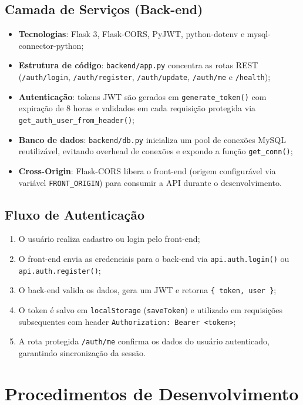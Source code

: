 \subsection{Camada de Serviços (Back-end)}
\begin{itemize}
    \item \textbf{Tecnologias}: Flask 3, Flask-CORS, PyJWT, python-dotenv e mysql-connector-python;
    \item \textbf{Estrutura de código}: \texttt{backend/app.py} concentra as rotas REST (\texttt{/auth/login}, \texttt{/auth/register}, \texttt{/auth/update}, \texttt{/auth/me} e \texttt{/health});
    \item \textbf{Autenticação}: tokens JWT são gerados em \texttt{generate\_token()} com expiração de 8 horas e validados em cada requisição protegida via \texttt{get\_auth\_user\_from\_header()};
    \item \textbf{Banco de dados}: \texttt{backend/db.py} inicializa um pool de conexões MySQL reutilizável, evitando overhead de conexões e expondo a função \texttt{get\_conn()};
    \item \textbf{Cross-Origin}: Flask-CORS libera o front-end (origem configurável via variável \texttt{FRONT\_ORIGIN}) para consumir a API durante o desenvolvimento.
\end{itemize}

\subsection{Fluxo de Autenticação}
\begin{enumerate}
    \item O usuário realiza cadastro ou login pelo front-end;
    \item O front-end envia as credenciais para o back-end via \texttt{api.auth.login()} ou \texttt{api.auth.register()};
    \item O back-end valida os dados, gera um JWT e retorna \texttt{\{ token, user \}};
    \item O token é salvo em \texttt{localStorage} (\texttt{saveToken}) e utilizado em requisições subsequentes com header \texttt{Authorization: Bearer <token>};
    \item A rota protegida \texttt{/auth/me} confirma os dados do usuário autenticado, garantindo sincronização da sessão.
\end{enumerate}

\section{Procedimentos de Desenvolvimento}

